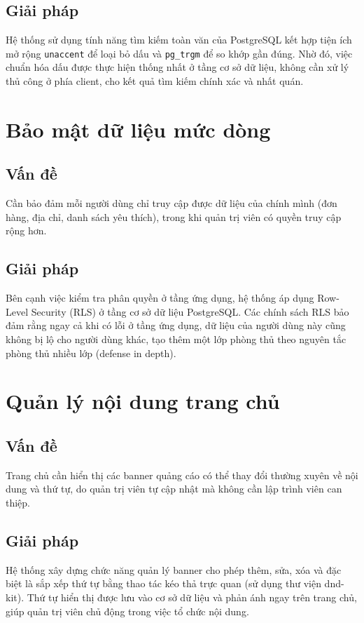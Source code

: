 \subsection{Giải pháp}
Hệ thống sử dụng tính năng tìm kiếm toàn văn của PostgreSQL kết hợp tiện ích mở rộng
\texttt{unaccent} để loại bỏ dấu và \texttt{pg\_trgm} để so khớp gần đúng. Nhờ đó, việc chuẩn
hóa dấu được thực hiện thống nhất ở tầng cơ sở dữ liệu, không cần xử lý thủ công ở phía client, cho
kết quả tìm kiếm chính xác và nhất quán.

\section{Bảo mật dữ liệu mức dòng}

\subsection{Vấn đề}
Cần bảo đảm mỗi người dùng chỉ truy cập được dữ liệu của chính mình (đơn hàng, địa chỉ, danh
sách yêu thích), trong khi quản trị viên có quyền truy cập rộng hơn.

\subsection{Giải pháp}
Bên cạnh việc kiểm tra phân quyền ở tầng ứng dụng, hệ thống áp dụng Row-Level Security (RLS)
ở tầng cơ sở dữ liệu PostgreSQL. Các chính sách RLS bảo đảm rằng ngay cả khi có lỗi ở tầng ứng
dụng, dữ liệu của người dùng này cũng không bị lộ cho người dùng khác, tạo thêm một lớp phòng
thủ theo nguyên tắc phòng thủ nhiều lớp (defense in depth).

\section{Quản lý nội dung trang chủ}

\subsection{Vấn đề}
Trang chủ cần hiển thị các banner quảng cáo có thể thay đổi thường xuyên về nội dung và thứ tự,
do quản trị viên tự cập nhật mà không cần lập trình viên can thiệp.

\subsection{Giải pháp}
Hệ thống xây dựng chức năng quản lý banner cho phép thêm, sửa, xóa và đặc biệt là sắp xếp thứ
tự bằng thao tác kéo thả trực quan (sử dụng thư viện dnd-kit). Thứ tự hiển thị được lưu vào cơ sở
dữ liệu và phản ánh ngay trên trang chủ, giúp quản trị viên chủ động trong việc tổ chức nội dung.

